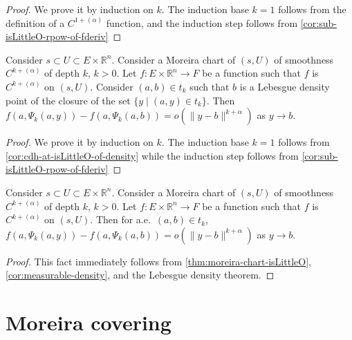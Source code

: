 \begin{proof}
  We prove it by induction on \(k\).
  The induction base \(k = 1\) follows from the definition of a \(C^{1+(\alpha)}\) function,
  and the induction step follows from \autoref{cor:sub-isLittleO-rpow-of-fderiv}
\end{proof}

\begin{theorem}%
  \label{thm:moreira-chart-isLittleO}
  Consider \(s\subset U\subset E\times\mathbb R^{n}\).
  Consider a Moreira chart of \((s, U)\) of smoothness \(C^{k+(\alpha)}\) of depth \(k\), \(k > 0\).
  Let \(f\colon E\times\mathbb R^{n}\to F\) be a function
  such that \(f\) is \(C^{k+(\alpha)}\) on \((s, U)\).
  Consider \((a, b)\in t_{k}\) such that \(b\) is a Lebesgue density point of the closure of the set \(\{y\mid (a, y)\in t_{k}\}\).
  Then \(f(a, \Psi_{k}(a, y)) - f(a, \Psi_{k}(a, b))=o\left(\|y - b\|^{k + \alpha}\right)\) as \(y\to b\).
\end{theorem}

\begin{proof}
  We prove it by induction on \(k\).
  The induction base \(k = 1\) follows from \autoref{cor:cdh-at-isLittleO-of-density}
  while the induction step follows from \autoref{cor:sub-isLittleO-rpow-of-fderiv}
\end{proof}

\begin{corollary}%
  \label{cor:moreira-chart-ae-isLittleO}
  Consider \(s\subset U\subset E\times\mathbb R^{n}\).
  Consider a Moreira chart of \((s, U)\) of smoothness \(C^{k+(\alpha)}\) of depth \(k\), \(k > 0\).
  Let \(f\colon E\times\mathbb R^{n}\to F\) be a function
  such that \(f\) is \(C^{k+(\alpha)}\) on \((s, U)\).
  Then for a.e.\ \((a, b) \in t_{k}\), \(f(a, \Psi_{k}(a, y)) - f(a, \Psi_{k}(a, b))=o\left(\|y - b\|^{k + \alpha}\right)\) as \(y\to b\).
\end{corollary}

\begin{proof}
  This fact immediately follows from \autoref{thm:moreira-chart-isLittleO}, \autoref{cor:measurable-density},
  and the Lebesgue density theorem.
\end{proof}

\section{Moreira covering}%
\label{sec:moreira-covering}

